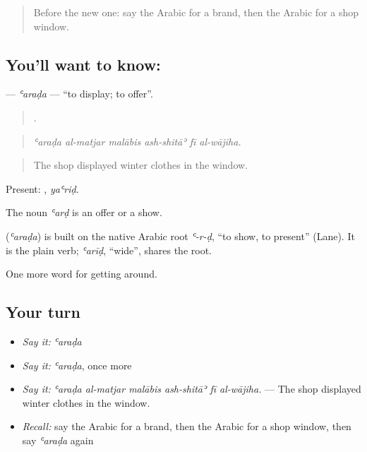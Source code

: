 \label{lesson:AR-C455-arada-display}



\begin{quote}
Before the new one: say the Arabic for a brand, then the Arabic for a shop window.
\end{quote}

\subsection*{You'll want to know: }
\textbf{} — \emph{ʿaraḍa} — \textquotedblleft{}to display; to offer\textquotedblright{}.

\begin{quote}
     .
\end{quote}

\begin{quote}
\emph{ʿaraḍa al-matjar malābis ash-shitāʾ fī al-wājiha.}
\end{quote}

\begin{quote}
The shop displayed winter clothes in the window.
\end{quote}

Present: , \emph{yaʿriḍ}.

The noun \emph{ʿarḍ} is an offer or a show.

\begin{cousinweb}
\textbf{} (\emph{ʿaraḍa}) is built on the native Arabic root \emph{ʿ-r-ḍ}, \textquotedblleft{}to show, to present\textquotedblright{} (Lane). It is the plain verb; \emph{ʿarīḍ}, \textquotedblleft{}wide\textquotedblright{}, shares the root.
\end{cousinweb}

\begin{grammarlens}[title={What you've built}]
One more word for getting around.
\end{grammarlens}

\subsection*{Your turn}
\begin{itemize}
\raggedright
  \item \emph{Say it:} \emph{ʿaraḍa}
  \item \emph{Say it:} \emph{ʿaraḍa}, once more
  \item \emph{Say it:} \emph{ʿaraḍa al-matjar malābis ash-shitāʾ fī al-wājiha.} — The shop displayed winter clothes in the window.
  \item \emph{Recall:} say the Arabic for a brand, then the Arabic for a shop window, then say \emph{ʿaraḍa} again
\end{itemize}

